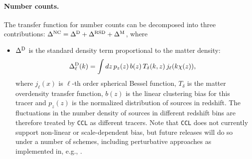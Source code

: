 \documentclass[\docopts]{\docclass}
\newcommand{\ccl}{{\tt CCL}\xspace}
\begin{document}
\paragraph{\bf Number counts.} The transfer function for number counts can be decomposed into three contributions: $\Delta^{\rm NC}=\Delta^{\rm D}+\Delta^{\rm RSD}+\Delta^{\rm M}$, where
\begin{itemize}
  \item $\Delta^{\rm D}$ is the standard density term proportional to the matter density:
        \begin{equation}\label{eq:transfer_nc}
          \Delta^{\rm D}_\ell(k)=\int dz\,p_z(z)\,b(z)\,T_\delta(k,z)\,j_\ell(k\chi(z)),
        \end{equation}
        where $j_\ell(x)$ is $\ell$-th order spherical Bessel function, $T_\delta$ is the matter overdensity transfer function, $b(z)$ is the linear clustering bias for this tracer and $p_z(z)$ is the normalized distribution of sources in redshift. The fluctuations in the number density of sources in different redshift bins are therefore treated by \ccl as different tracers. Note that \ccl does not currently support non-linear or scale-dependent bias, but future releases will do so under a number of schemes, including perturbative approaches as implemented in, e.g., \citet{FASTPT}.
        

\end{itemize}
\end{document}

